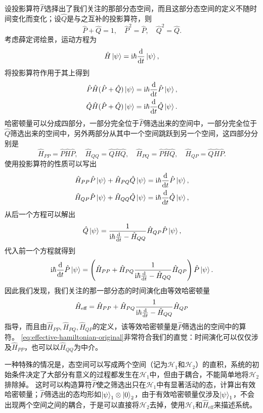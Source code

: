 \documentclass[hyperref, UTF8, a4paper]{ctexart}
\newcommand*{\ii}{\mathrm{i}}
\begin{document}
设投影算符$\hat{P}$选择出了我们关注的那部分态空间，而且这部分态空间的定义不随时间变化而变化；设$\hat{Q}$是与之互补的投影算符，则
\[
    \hat{P} + \hat{Q} = 1, \quad \hat{P}^2 = \hat{P}, \quad \hat{Q}^2 = \hat{Q}.
\]
考虑薛定谔绘景，运动方程为
\[
    \hat{H} \ket{\psi} = \ii \hbar \dv{t} \ket{\psi},
\]
将投影算符作用于其上得到
\[
    \begin{aligned}
        \hat{P} \hat{H}(\hat{P}+\hat{Q}) \ket{\psi} = \ii \hbar \dv{t} \hat{P} \ket{\psi}, \\
        \hat{Q} \hat{H}(\hat{P}+\hat{Q}) \ket{\psi} = \ii \hbar \dv{t} \hat{Q} \ket{\psi}.
    \end{aligned}
\]
哈密顿量可以分成四部分，一部分完全位于$\hat{P}$筛选出来的空间中，一部分完全位于$\hat{Q}$筛选出来的空间中，另外两部分从其中一个空间跳跃到另一个空间，这四部分分别是
\[
    \hat{H}_{PP} = \hat{P} \hat{H} \hat{P}, \quad \hat{H}_{QQ} = \hat{Q} \hat{H} \hat{Q}, \quad \hat{H}_{PQ} = \hat{P} \hat{H} \hat{Q}, \quad \hat{H}_{QP} = \hat{Q} \hat{H} \hat{P}.
\]
使用投影算符的性质可以写出
\[
    \begin{aligned}
        \hat{H}_{PP} \hat{P} \ket{\psi} + \hat{H}_{PQ} \hat{Q} \ket{\psi} = \ii \hbar \dv{t} \hat{P} \ket{\psi}, \\
        \hat{H}_{QP} \hat{P} \ket{\psi} + \hat{H}_{QQ} \hat{Q} \ket{\psi} = \ii \hbar \dv{t} \hat{Q} \ket{\psi},
    \end{aligned}
\]
从后一个方程可以解出
\[
    \hat{Q} \ket{\psi} = \frac{1}{\ii \hbar \dv{t} - \hat{H}_{QQ}} \hat{H}_{QP} \hat{P} \ket{\psi},
\]
代入前一个方程就得到
\[
    \ii \hbar \dv{t} \hat{P} \ket{\psi} = \left(\hat{H}_{PP} + \hat{H}_{PQ} \frac{1}{\ii \hbar \dv{t} - \hat{H}_{QQ}} \hat{H}_{QP}\right) \hat{P} \ket{\psi}.
\]
因此我们发现，我们关注的那一部分态的时间演化由等效哈密顿量
\begin{equation}
    \hat{H}_\text{eff} = \hat{H}_{PP} + \hat{H}_{PQ} \frac{1}{\ii \hbar \dv{t} - \hat{H}_{QQ}} \hat{H}_{QP}
    \label{eq:effective-hamiltonian-original}
\end{equation}
指导，而且由$\hat{H}_{PP}, \hat{H}_{PQ}, \hat{H}_{QP}$的定义，该等效哈密顿量是$\hat{P}$筛选出的空间中的算符。
\eqref{eq:effective-hamiltonian-original}非常符合我们的直觉：时间演化可以仅仅涉及$\hat{H}_{PP}$，也可以以$\hat{H}_{QQ}$为中介。

一种特殊的情况是，态空间可以写成两个空间（记为$\mathcal{H}_1$和$\mathcal{H}_2$）的直积，系统的初始条件决定了大部分有意义的过程都发生在$\mathcal{H}_1$中，但由于耦合，不能简单地将$\mathcal{H}_2$排除掉。
这时可以构造算符$\hat{P}$使之筛选出只在$\mathcal{H}_1$中有显著活动的态，计算出有效哈密顿量；$\hat{P}$筛选出的态均形如$\ket{\psi}_1 \otimes \ket{0}_2$，由于有效哈密顿量仅涉及$\ket{\psi}_1$，不会出现两个空间之间的耦合，于是可以直接将$\mathcal{H}_2$去掉，使用$\mathcal{H}_1$和$\hat{H}_\text{eff}$来描述系统。
\end{document}
